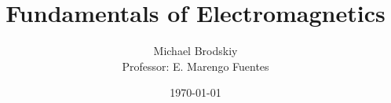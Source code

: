 


\title{Fundamentals of Electromagnetics}
\date{\today}
\author{Michael Brodskiy\\ \small Professor: E. Marengo Fuentes}



\maketitle

